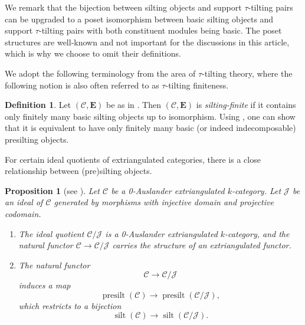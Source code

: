 \documentclass[10pt,twoside, a4paper,reqno]{amsart}
\DeclareMathOperator{\silt}{silt}
\DeclareMathOperator{\presilt}{presilt}
\newcommand{\calC}{\mathcal{C}}
\newcommand{\E}{\mathbf{E}}
\newtheorem{proposition}[theorem]{Proposition}
\theoremstyle{definition}
\newtheorem{definition}[theorem]{Definition}
\begin{document}
We remark that the bijection between silting objects and support $\tau$-tilting pairs can be upgraded to a poset isomorphism between basic silting objects and support $\tau$-tilting pairs with both constituent modules being basic. The poset structures are well-known and not important for the discussions in this article, which is why we choose to omit their definitions. 

We adopt the following terminology from the area of $\tau$-tilting theory, where the following notion is also often referred to as $\tau$-tilting finiteness.

\begin{definition}
    Let $(\calC,\E)$ be as in . Then $(\calC,\E)$ is \textit{silting-finite} if it contains only finitely many basic silting objects up to isomorphism. Using , one can show that it is equivalent to have only finitely many basic (or indeed indecomposable) presilting objects.
\end{definition}

For certain ideal quotients of extriangulated categories, there is a close relationship between (pre)silting objects.

\begin{proposition}[see {\cite[Cor. 3.3 and Prop. 3.5]{FGPPP23}}]\label{prop:FGPPP23}
Let $\calC$ be a 0-Auslander extriangulated $k$-category. Let $\mathcal{J}$ be an ideal of $\calC$ generated by morphisms with injective domain and projective codomain. 
    \begin{enumerate}
        \item\label{prop:FGPPP23.3.3}
          The ideal quotient $\calC/\mathcal{J}$ is a 0-Auslander extriangulated $k$-category, and the natural functor ${\calC} \to \calC/\mathcal{J}$ carries the structure of an extriangulated functor. 
        \item\label{prop:FGPPP23.3.5} The natural functor 
    \begin{equation}\label{eq:toJ}
        {\calC} \to \calC/\mathcal{J}
    \end{equation}
    induces a map
    \begin{equation*}
        \presilt({\calC}) \xrightarrow{} \presilt(\calC/\mathcal{J}),
    \end{equation*}
    which restricts to a bijection
    \begin{equation*}
        \silt({\calC}) \xrightarrow{} \silt(\calC/\mathcal{J}).
    \end{equation*}
    \end{enumerate}
\end{proposition}
\end{document}
